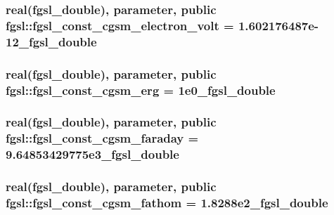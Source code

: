 \subsubsection[{fgsl\+\_\+const\+\_\+cgsm\+\_\+electron\+\_\+volt}]{\setlength{\rightskip}{0pt plus 5cm}real({\bf fgsl\+\_\+double}), parameter, public fgsl\+::fgsl\+\_\+const\+\_\+cgsm\+\_\+electron\+\_\+volt = 1.\+602176487e-\/12\+\_\+fgsl\+\_\+double}\label{namespacefgsl_aeec1dd933fc3bc5a582363056455d46c}
\hypertarget{namespacefgsl_aa30f1017800c569944ad894fff2ae006}{}
\subsubsection[{fgsl\+\_\+const\+\_\+cgsm\+\_\+erg}]{\setlength{\rightskip}{0pt plus 5cm}real({\bf fgsl\+\_\+double}), parameter, public fgsl\+::fgsl\+\_\+const\+\_\+cgsm\+\_\+erg = 1e0\+\_\+fgsl\+\_\+double}\label{namespacefgsl_aa30f1017800c569944ad894fff2ae006}
\hypertarget{namespacefgsl_a147d94db9ca3b698ccb636b75b27484e}{}
\subsubsection[{fgsl\+\_\+const\+\_\+cgsm\+\_\+faraday}]{\setlength{\rightskip}{0pt plus 5cm}real({\bf fgsl\+\_\+double}), parameter, public fgsl\+::fgsl\+\_\+const\+\_\+cgsm\+\_\+faraday = 9.\+64853429775e3\+\_\+fgsl\+\_\+double}\label{namespacefgsl_a147d94db9ca3b698ccb636b75b27484e}
\hypertarget{namespacefgsl_a8351533377c64da8b76317b3172c1c76}{}
\subsubsection[{fgsl\+\_\+const\+\_\+cgsm\+\_\+fathom}]{\setlength{\rightskip}{0pt plus 5cm}real({\bf fgsl\+\_\+double}), parameter, public fgsl\+::fgsl\+\_\+const\+\_\+cgsm\+\_\+fathom = 1.\+8288e2\+\_\+fgsl\+\_\+double}\label{namespacefgsl_a8351533377c64da8b76317b3172c1c76}
\hypertarget{namespacefgsl_ada803a980994f045ecc9fa32cebad23b}{}
